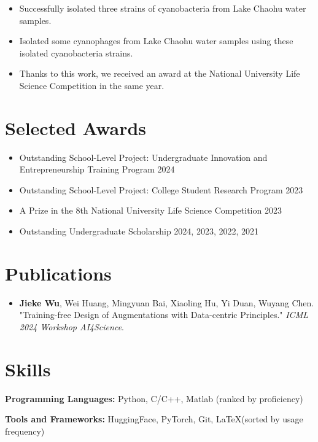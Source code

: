 \documentclass{resume}
\begin{document}
    \begin{itemize}
      \item Successfully isolated three strains of cyanobacteria from Lake Chaohu water samples.
      \item Isolated some cyanophages from Lake Chaohu water samples using these isolated cyanobacteria strains.
      \item Thanks to this work, we received an award at the National University Life Science Competition in the same year.
    \end{itemize}

\section{Selected Awards}
  \begin{itemize}
      \item Outstanding School-Level Project: Undergraduate Innovation and Entrepreneurship Training Program \hfill 2024
      \item Outstanding School-Level Project: College Student Research Program \hfill 2023
      \item A Prize in the 8th National University Life Science Competition \hfill 2023
      \item Outstanding Undergraduate Scholarship  \hfill 2024, 2023, 2022, 2021
  \end{itemize}

\section{Publications}

\begin{itemize}
  \item \textbf{Jieke Wu}, Wei Huang, Mingyuan Bai, Xiaoling Hu, Yi Duan, Wuyang Chen. "Training-free Design of Augmentations with Data-centric Principles." \emph{ICML 2024 Workshop AI4Science}.
\end{itemize}

\section{Skills}
  \textbf{Programming Languages:} \small Python, C/C++, Matlab (ranked by proficiency)

  \textbf{Tools and Frameworks:} \small HuggingFace, PyTorch, Git, \LaTeX (sorted by usage frequency) 
\end{document}
